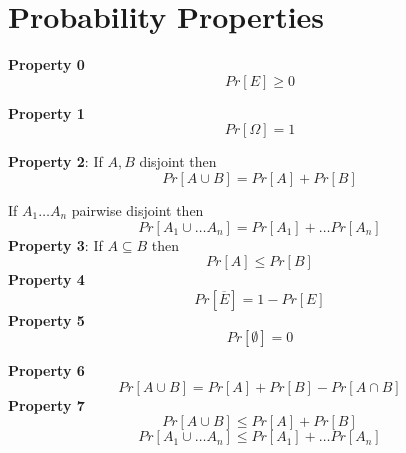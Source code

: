 \section{Probability Properties}

\begin{framed}
   \textbf{Property 0}
   \[
      Pr[E] \geq 0
   \] 

   \textbf{Property 1}
   \[
      Pr[\Omega] = 1
   \] 

   \textbf{Property 2}: If $A, B$ disjoint then 
   \[
      Pr[A \cup B] = Pr[A] + Pr[B]
   \]  

   If $A_1 \hdots A_n$ pairwise disjoint then
   \[
      Pr[A_1 \cup \hdots A_n ] = Pr[A_1] + \hdots Pr[A_n]
   \] 
   \textbf{Property 3}: If $A \subseteq B$ then
   \[
      Pr[A] \leq Pr[B]
   \] 
   \textbf{Property 4}
   \[
      Pr[\overline{E}] = 1 - Pr[E]
   \] 
   \textbf{Property 5}
   \[
      Pr[\emptyset] = 0
   \] 

   \textbf{Property 6}
   \[
      Pr [ A \cup B] = Pr[A] + Pr[B] - Pr[A \cap B]
   \] 
   \textbf{Property 7}
   \[
      Pr[A \cup B] \leq Pr[A] + Pr[B]
   \] 
   \[
      Pr[A_1 \cup \hdots A_n] \leq Pr[A_1] + \hdots Pr[A_n]
   \] 
  
\end{framed}

